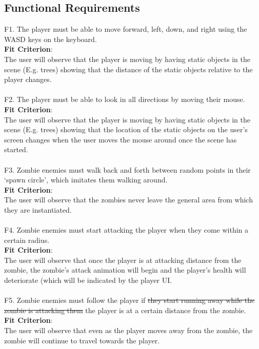 \documentclass[12pt, titlepage]{article}
\begin{document}

\subsection{Functional Requirements} \label{Functional Requirements}

{\color{magenta} F1.} The player must be able to move forward, left, down, and right using the WASD keys {\color{magenta} on the keyboard.\\
\textbf{Fit Criterion}:\\ The user will observe that the player is moving by having static objects in the scene (E.g. trees) showing that the distance of the static objects relative to the player changes}. 
\\\\
{\color{magenta} F2.} The player must be able to look in all directions by moving their mouse. \\
{\color{magenta} \textbf{Fit Criterion}:\\ The user will observe that the player is moving by having static objects in the scene (E.g. trees) showing that the location of the static objects on the user's screen changes when the user moves the mouse around once the scene has started}. 
\\\\
{\color{magenta} F3.} Zombie enemies must walk back and forth between random points in their ‘spawn circle’, which imitates them walking around.\\ {\color{magenta} \textbf{Fit Criterion}:\\ The user will observe that the zombies never leave the general area from which they are instantiated}. 
\\\\
{\color{magenta} F4.} Zombie enemies must start attacking the player when they come within a certain radius. \\
{\color{magenta} \textbf{Fit Criterion}:\\ The user will observe that once the player is at attacking distance from the zombie, the zombie's attack animation will begin and the player's health will deteriorate (which will be indicated by the player UI}. 
\\\\
{\color{magenta} F5.} Zombie enemies must follow the player if \sout{they start running away while the zombie is attacking them} {\color{magenta} the player is at a certain distance from the zombie. \\
\textbf{Fit Criterion}:\\ The user will observe that even as the player moves away from the zombie, the zombie will continue to travel towards the player}. 
\end{document}
